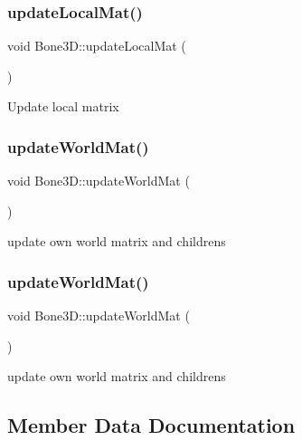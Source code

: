 \subsubsection{\texorpdfstring{update\+Local\+Mat()}{updateLocalMat()}\hspace{0.1cm}{\footnotesize\ttfamily [2/2]}}
{\footnotesize\ttfamily void Bone3\+D\+::update\+Local\+Mat (\begin{DoxyParamCaption}{ }\end{DoxyParamCaption})\hspace{0.3cm}{\ttfamily [protected]}}

Update local matrix \mbox{\label{classBone3D_a9b804338ec06abeed0e6b50c8b17103a}} 
\subsubsection{\texorpdfstring{update\+World\+Mat()}{updateWorldMat()}\hspace{0.1cm}{\footnotesize\ttfamily [1/2]}}
{\footnotesize\ttfamily void Bone3\+D\+::update\+World\+Mat (\begin{DoxyParamCaption}{ }\end{DoxyParamCaption})}

update own world matrix and children\textquotesingle{}s \mbox{\label{classBone3D_a9b804338ec06abeed0e6b50c8b17103a}} 
\subsubsection{\texorpdfstring{update\+World\+Mat()}{updateWorldMat()}\hspace{0.1cm}{\footnotesize\ttfamily [2/2]}}
{\footnotesize\ttfamily void Bone3\+D\+::update\+World\+Mat (\begin{DoxyParamCaption}{ }\end{DoxyParamCaption})}

update own world matrix and children\textquotesingle{}s 

\subsection{Member Data Documentation}
\mbox{\label{classBone3D_ab8779fd741f178117b2dfe1cb8b79fb6}} 
